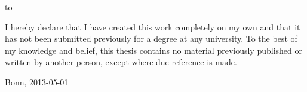 \thispagestyle{empty}

\vspace*{35\baselineskip}

\begin{minipage}{\fullwidth}
\hbox to \textwidth{\hrulefill}
\par
I hereby declare that I have created this work completely on my own and that it has not been submitted previously for a degree at any university. To the best of my knowledge and belief, this thesis contains no material previously published or written by another person, except where due reference is made.

\vspace{1cm}
Bonn, 2013-05-01

\end{minipage}
